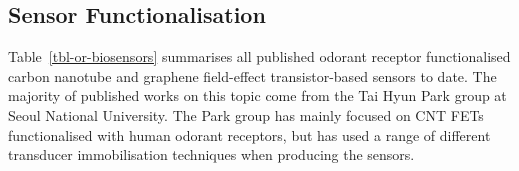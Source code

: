 \documentclass[
  a4paper,
]{scrbook}
\begin{document}
\hypertarget{sec-sensor-types}{%
\subsection{Sensor Functionalisation}\label{sec-sensor-types}}

Table~\ref{tbl-or-biosensors} summarises all published odorant receptor
functionalised carbon nanotube and graphene field-effect
transistor-based sensors to date. The majority of published works on
this topic come from the Tai Hyun Park group at Seoul National
University. The Park group has mainly focused on CNT FETs functionalised
with human odorant receptors, but has used a range of different
transducer immobilisation techniques when producing the sensors.

\end{document}
